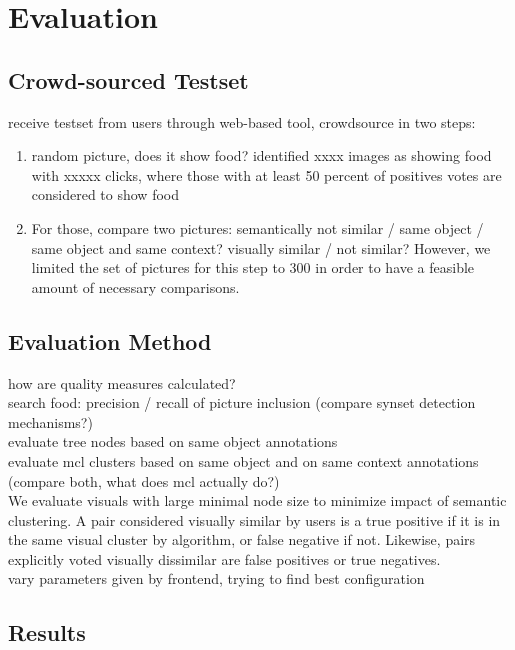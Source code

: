 %
\section{Evaluation}
\label{sec_literatur}

\subsection{Crowd-sourced Testset}
receive testset from users through web-based tool, crowdsource in two steps: \\

\begin{enumerate}
\item random picture, does it show food? identified xxxx images as showing food with xxxxx clicks, where those with at least 50 percent of positives votes are considered to show food \\
\item For those, compare two pictures: semantically not similar / same object / same object and same context? visually similar / not similar? However, we limited the set of pictures for this step to 300 in order to have a feasible amount of necessary comparisons.\\
\end{enumerate}

\subsection{Evaluation Method}
how are quality measures calculated? \\

search food: precision  / recall of picture inclusion (compare synset detection mechanisms?) \\
evaluate tree nodes based on same object annotations \\
evaluate mcl clusters based on same object and on same context annotations (compare both, what does mcl actually do?) \\

We evaluate visuals with large minimal node size to minimize impact of semantic clustering. A pair considered visually similar by users is a true positive if it is in the same visual cluster by algorithm, or false negative if not. Likewise, pairs explicitly voted visually dissimilar are false positives or true negatives. \\

vary parameters given by frontend, trying to find best configuration \\

\subsection{Results}

\missingfigure{}